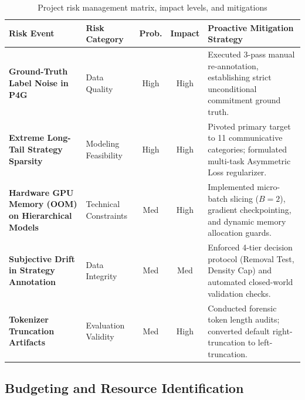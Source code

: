 \begin{table}[htbp]
  \centering
  \small
  \caption{Project risk management matrix, impact levels, and mitigations}
  \label{tab:risk-matrix}
  \begin{tabularx}{\textwidth}{>{\raggedright\arraybackslash\bfseries}p{} >{\raggedright\arraybackslash}p{} cc >{\raggedright\arraybackslash}X}
    \toprule
    \textbf{Risk Event} & \textbf{Risk Category} & \textbf{Prob.} & \textbf{Impact} & \textbf{Proactive Mitigation Strategy} \\
    \midrule
    Ground-Truth Label Noise in P4G & Data Quality & High & High & Executed 3-pass manual re-annotation, establishing strict unconditional commitment ground truth. \\
    \rowcolor{lightbg}
    Extreme Long-Tail Strategy Sparsity & Modeling Feasibility & High & High & Pivoted primary target to 11 communicative categories; formulated multi-task Asymmetric Loss regularizer. \\
    Hardware GPU Memory (OOM) on Hierarchical Models & Technical Constraints & Med & High & Implemented micro-batch slicing ($B=2$), gradient checkpointing, and dynamic memory allocation guards. \\
    \rowcolor{lightbg}
    Subjective Drift in Strategy Annotation & Data Integrity & Med & Med & Enforced 4-tier decision protocol (Removal Test, Density Cap) and automated closed-world validation checks. \\
    Tokenizer Truncation Artifacts & Evaluation Validity & Med & High & Conducted forensic token length audits; converted default right-truncation to left-truncation. \\
    \bottomrule
  \end{tabularx}
\end{table}

\subsection{Budgeting and Resource Identification}
\label{sec:budget}

